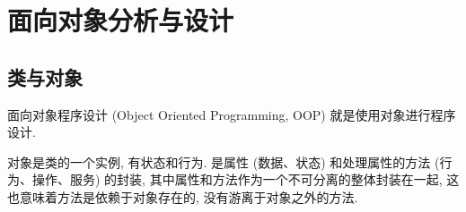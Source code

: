 \documentclass[10pt,UTF8]{book} %
\begin{document}



% 







\newpage
\thispagestyle{empty}

\pagestyle{plain}
{\tableofcontents}
\newpage
\thispagestyle{empty}
\cleardoublepage %


\makeatletter
\let\ps@plain\ps@empty
\makeatother

\mainmatter

\part{面向对象分析与设计}

\chapter{类与对象}

面向对象程序设计 (Object Oriented Programming, OOP)
就是使用对象进行程序设计.

对象是类的一个实例, 有状态和行为. 是属性 (数据、状态) 和处理属性的方法 
(行为、操作、服务) 的封装, 其中属性和方法作为一个不可分离的整体封装在一起, 
这也意味着方法是依赖于对象存在的, 没有游离于对象之外的方法.
\end{document}
